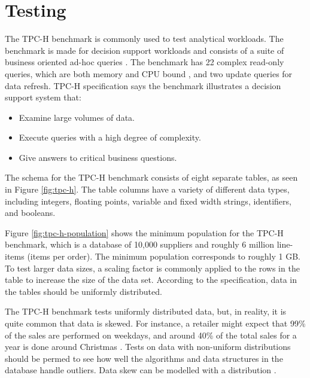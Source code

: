 \section{Testing}
\label{sec:Testing}
The TPC-H benchmark is commonly used to test analytical workloads. The benchmark is made for decision support workloads and consists of a suite of business oriented ad-hoc queries \cite{Transaction_Processing_Performance_Council_TPC2014-ux}. The benchmark has 22 complex read-only queries, which are both memory and CPU bound \cite{Boncz2005-wj}, and two update queries for data refresh. TPC-H specification says the benchmark illustrates a decision support system that:
\begin{itemize}
  \item Examine large volumes of data.
  \item Execute queries with a high degree of complexity.
  \item Give answers to critical business questions.
\end{itemize}

The schema for the TPC-H benchmark consists of eight separate tables, as seen in Figure \ref{fig:tpc-h}. The table columns have a variety of different data types, including integers, floating points, variable and fixed width strings, identifiers, and booleans. 

Figure \ref{fig:tpc-h-population} shows the minimum population for the TPC-H benchmark, which is a database of 10,000 suppliers and roughly 6 million line-items (items per order). The minimum population corresponds to roughly 1 GB. To test larger data sizes, a scaling factor is commonly applied to the rows in the table to increase the size of the data set. According to the specification, data in the tables should be uniformly distributed.

The TPC-H benchmark tests uniformly distributed data, but, in reality, it is quite common that data is skewed. For instance, a retailer might expect that 99\% of the sales are performed on weekdays, and around 40\% of the total sales for a year is done around Christmas \cite{Raman2008-gi}. Tests on data with non-uniform distributions should be permed to see how well the algorithms and data structures in the database handle outliers. Data skew can be modelled with a  distribution \cite{Holloway2008-rr}. 

